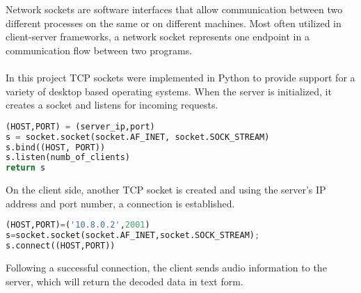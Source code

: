 Network sockets are software interfaces that allow communication between two different processes on the same or on different machines.
Most often utilized in client-server frameworks, a network socket represents one endpoint in a communication flow between two programs.\\\\
In this project TCP sockets were implemented in Python to provide support for a variety of desktop based operating systems.
When the server is initialized, it creates a socket and listens for incoming requests.
\begin{lstlisting}[language=Python, flexiblecolumns=true, caption=Server initialization.]
(HOST,PORT) = (server_ip,port)
s = socket.socket(socket.AF_INET, socket.SOCK_STREAM)
s.bind((HOST, PORT))
s.listen(numb_of_clients)
return s
\end{lstlisting}
On the client side, another TCP socket is created and using the server's IP address and port number, a connection is established. 
\begin{lstlisting}[language=Python, flexiblecolumns=true, caption=Client initialization.]
(HOST,PORT)=('10.8.0.2',2001)
s=socket.socket(socket.AF_INET,socket.SOCK_STREAM);
s.connect((HOST,PORT))
\end{lstlisting}
Following a successful connection, the client sends audio information to the server, which will return the decoded data in text form. 